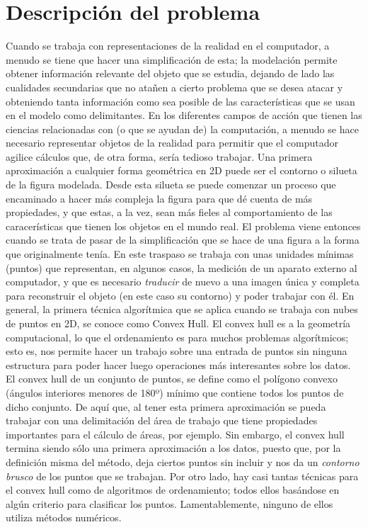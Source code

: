 \documentclass[final, 12pt letterpaper]{article}
\begin{document}
\section{Descripción del problema}
Cuando se trabaja con representaciones de la realidad en el computador, a menudo se tiene que hacer una simplificación de esta; la modelación permite obtener información relevante del objeto que se estudia, dejando de lado las cualidades secundarias que no atañen a cierto problema que se desea atacar y obteniendo tanta información como sea posible de las características que se usan en el modelo como delimitantes. 
En los diferentes campos de acción que tienen las ciencias relacionadas con (o que se ayudan de) la computación, a menudo se hace necesario representar objetos de la realidad para permitir que el computador agilice cálculos que, de otra forma, sería tedioso trabajar. Una primera aproximación a cualquier forma geométrica en 2D puede ser el contorno o silueta de la figura modelada. Desde esta silueta se puede comenzar un proceso que encaminado a hacer más compleja la figura para que dé cuenta de más propiedades, y que estas, a la vez, sean más fieles al comportamiento de las caracerísticas que tienen los objetos en el mundo real.
El problema viene entonces cuando se trata de pasar de la simplificación que se hace de una figura a la forma que originalmente tenía. En este traspaso se trabaja con unas unidades mínimas (puntos) que representan, en algunos casos, la medición de un aparato externo al computador, y que es necesario \emph{traducir} de nuevo a una imagen única y completa para reconstruir el objeto (en este caso su contorno) y poder trabajar con él.
En general, la primera técnica algorítmica que se aplica cuando se trabaja con nubes de puntos en 2D, se conoce como Convex Hull. El convex hull es a la geometría computacional, lo que el ordenamiento es para muchos problemas algorítmicos; esto es, nos permite hacer un trabajo sobre una entrada de puntos sin ninguna estructura para poder hacer luego operaciones más interesantes sobre los datos. 
El convex hull de un conjunto de puntos, se define como el polígono convexo (ángulos interiores menores de 180º) mínimo que contiene todos los puntos de dicho conjunto. De aquí que, al tener esta primera aproximación se pueda trabajar con una delimitación del área de trabajo que tiene propiedades importantes para el cálculo de áreas, por ejemplo. Sin embargo, el convex hull termina siendo sólo una primera aproximación a los datos, puesto que, por la definición misma del método, deja ciertos puntos sin incluir y nos da un \emph{contorno brusco} de los puntos que se trabajan. Por otro lado, hay casi tantas técnicas para el convex hull como de algoritmos de ordenamiento; todos ellos basándose en algún criterio para clasificar los puntos. Lamentablemente, ninguno de ellos utiliza métodos numéricos.
\end{document}
